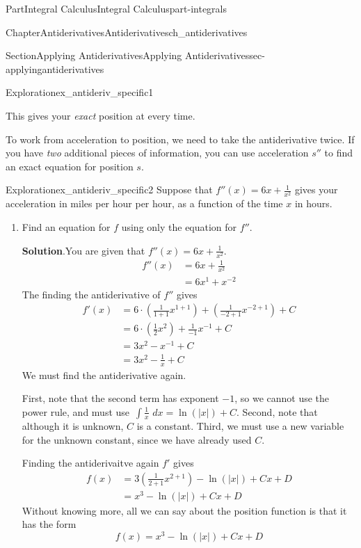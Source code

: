 \documentclass[oneside,10pt,]{tufte-book}
\newcommand{\blocktitlefont}{\relax}
\numberwithin{equation}{chapter}
\newcommand{\intdx}[1]{{\,\int#1\,\,dx}}
\newcommand{\amp}{&}
\begin{document}
\begin{partptx}{Part}{Integral Calculus}{}{Integral Calculus}{}{}{part-integrals}
\begin{chapterptx}{Chapter}{Antiderivatives}{}{Antiderivatives}{}{}{ch_antiderivatives}
\begin{sectionptx}{Section}{Applying Antiderivatives}{}{Applying Antiderivatives}{}{}{sec-applyingantiderivatives}
\begin{exploration}{Exploration}{}{ex_antideriv_specific1}
\begin{enumerate}[font=\bfseries,label=(\alph*),ref=\alph*]
This gives your \emph{exact} position at every time.%
\end{enumerate}%
\end{exploration}%
To work from acceleration to position, we need to take the antiderivative twice. If you have \emph{two} additional pieces of information, you can use acceleration \(s''\) to find an exact equation for position \(s\).%
\begin{exploration}{Exploration}{}{ex_antideriv_specific2}%
Suppose that \(f''(x) = 6x + \frac{1}{x^2}\) gives your acceleration in miles per hour per hour, as a function of the time \(x\) in hours.%
\begin{enumerate}[font=\bfseries,label=(\alph*),ref=\alph*]%
\item{}Find an equation for \(f\) using only the equation for \(f''\).%
\par\smallskip%
\noindent\textbf{\blocktitlefont Solution}.\hypertarget{ex_antideriv_specific2-2-2}{}\quad{}You are given that  \(f''(x) = 6x + \frac{1}{x^2}\).%
\begin{align*}
f''(x) \amp = 6x + \frac{1}{x^2}\\
\amp = 6x^1 + x^{-2} 
\end{align*}
The finding the  antiderivative of \(f''\) gives%
\begin{align*}
f'(x) \amp = 6\cdot(\frac{1}{1+1}x^{1+1}) + (\frac{1}{-2+1}x^{-2+1}) + C\\
\amp = 6\cdot(\frac{1}{2} x^2) + \frac{1}{-1}x^{-1} + C\\
\amp = 3 x^2  - x^{-1} + C \\
\amp = 3 x^2  - \frac{1}{x} + C 
\end{align*}
We must find the antiderivative again.%
\par
First, note that the second term has exponent \(-1\), so we cannot use the power rule, and must use \(\intdx{\frac{1}{x}}=\ln(|x|)+C\). Second, note that although it is unknown, \(C\) is a constant. Third, we must use a new variable for the unknown constant, since we have already used \(C\).%
\par
Finding the antiderivaitve again \(f'\) gives%
\begin{align*}
f(x) \amp = 3(\frac{1}{2+1}x^{2+1}) - \ln(|x|) + Cx + D\\
\amp = x^3 - \ln(|x|) + Cx + D
\end{align*}
Without knowing more, all we can say about the position function is that it has the form%
\begin{equation*}
f(x) = x^3 - \ln(|x|) + Cx + D

\end{equation*}
\end{enumerate}
\end{exploration}
\end{sectionptx}
\end{chapterptx}
\end{partptx}
\end{document}

